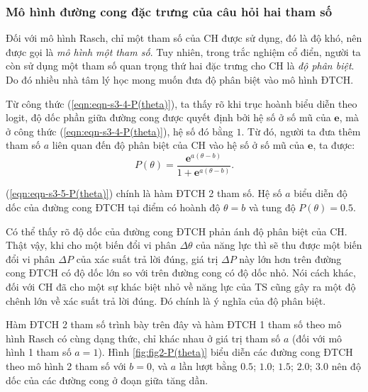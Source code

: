 \subsubsection{Mô hình đường cong đặc trưng của câu hỏi hai tham số}
Đối với mô hình Rasch, chỉ một tham số của CH được sử dụng, đó là độ khó, nên được gọi là \textit{mô hình một tham số}. Tuy nhiên, trong trắc nghiệm cổ điển, người ta còn sử dụng một tham số quan trọng thứ hai đặc trưng cho CH là \textit{độ phân biệt}. Do đó nhiều nhà tâm lý học mong muốn đưa độ phân biệt vào mô hình ĐTCH.\par
Từ công thức (\ref{eqn:eqn-s3-4-P(theta)}), ta thấy rõ khi trục hoành biểu diễn theo logit, độ dốc phần giữa đường cong được quyết định bởi hệ số ở số mũ của $\mathbf{e}$, mà ở công thức (\ref{eqn:eqn-s3-4-P(theta)}), hệ số đó bằng $1$. Từ đó, người ta đưa thêm tham số $a$ liên quan đến độ phân biệt của CH vào hệ số ở số mũ của $\mathbf{e}$, ta được:
\begin{equation}\label{eqn:eqn-s3-5-P(theta)}
	P(\theta)=\frac{\mathbf{e}^{a(\theta-b)}}{1+\mathbf{e}^{a(\theta-b)}}.
\end{equation}\par
(\ref{eqn:eqn-s3-5-P(theta)}) chính là hàm ĐTCH 2 tham số. Hệ số $a$ biểu diễn độ dốc của đường cong ĐTCH tại điểm có hoành độ $\theta=b$ và tung độ $P(\theta)=0.5$.\par
Có thể thấy rõ độ dốc của đường cong ĐTCH phản ánh độ phân biệt của CH. Thật vậy, khi cho một biến đổi vi phân $\Delta\theta$ của năng lực thì sẽ thu được một biến đổi vi phân $\Delta P$ của xác suất trả lời đúng, giá trị $\Delta P$ này lớn hơn trên đường cong ĐTCH có độ dốc lớn so với trên đường cong có độ dốc nhỏ. Nói cách khác, đối với CH đã cho một sự khác biệt nhỏ về năng lực của TS cũng gây ra một độ chênh lớn về xác suất trả lời đúng. Đó chính là ý nghĩa của độ phân biệt.\par
Hàm ĐTCH 2 tham số trình bày trên đây và hàm ĐTCH 1 tham số theo mô hình Rasch có cùng dạng thức, chỉ khác nhau ở giá trị tham số $a$ (đối với mô hình 1 tham số $a=1$). Hình \ref{fig:fig2-P(theta)} biểu diễn các đường cong ĐTCH theo mô hình 2 tham số với $b=0$, và $a$ lần lượt bằng {\color{mTeal}$0.5$}; {\color{mOrange}$1.0$}; {\color{mBlue}$1.5$}; {\color{mRed}$2.0$}; {\color{mPurple}$3.0$} nên độ dốc của các đường cong ở đoạn giữa tăng dần.\par
